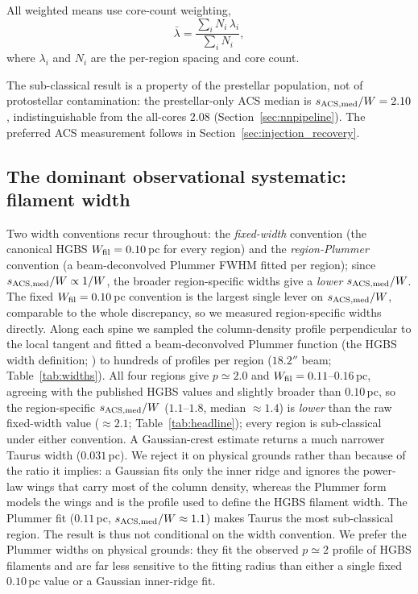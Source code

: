 \documentclass[usenatbib,twoside,twocolumn]{mnras}
\begin{document}
All weighted means use core-count weighting,
\begin{equation}
\bar{\lambda} = \frac{\sum_i N_i\,\lambda_i}{\sum_i N_i},
\label{eq:weighting}
\end{equation}
where $\lambda_i$ and $N_i$ are the per-region spacing and core count.

The sub-classical result is a property of the prestellar population, not of protostellar contamination: the prestellar-only ACS median is $s_{\rm ACS,med}/W=2.10$, indistinguishable from the all-cores $2.08$ (Section~\ref{sec:nnpipeline}). The preferred ACS measurement follows in Section~\ref{sec:injection_recovery}.

\subsection{The dominant observational systematic: filament width}
\label{sec:widths}

Two width conventions recur throughout: the \emph{fixed-width} convention (the canonical HGBS $W_{\rm fil}=0.10$\,pc for every region) and the \emph{region-Plummer} convention (a beam-deconvolved Plummer FWHM fitted per region); since $s_{\rm ACS,med}/W\propto1/W$, the broader region-specific widths give a \emph{lower} $s_{\rm ACS,med}/W$. The fixed $W_{\rm fil}=0.10$\,pc convention is the largest single lever on $s_{\rm ACS,med}/W$, comparable to the whole discrepancy, so we measured region-specific widths directly. Along each spine we sampled the column-density profile perpendicular to the local tangent and fitted a beam-deconvolved Plummer function (the HGBS width definition; \citealt{Arzoumanian2019}) to hundreds of profiles per region ($18.2''$ beam; Table~\ref{tab:widths}). All four regions give $p\simeq2.0$ and $W_{\rm fil}=0.11$--$0.16$\,pc, agreeing with the published HGBS values and slightly broader than $0.10$\,pc, so the region-specific $s_{\rm ACS,med}/W$ ($1.1$--$1.8$, median $\approx1.4$) is \emph{lower} than the raw fixed-width value ($\approx2.1$; Table~\ref{tab:headline}); every region is sub-classical under either convention. A Gaussian-crest estimate returns a much narrower Taurus width ($0.031$\,pc). We reject it on physical grounds rather than because of the ratio it implies: a Gaussian fits only the inner ridge and ignores the power-law wings that carry most of the column density, whereas the Plummer form models the wings and is the profile used to define the HGBS filament width. The Plummer fit ($0.11$\,pc, $s_{\rm ACS,med}/W\approx1.1$) makes Taurus the most sub-classical region. The result is thus not conditional on the width convention. We prefer the Plummer widths on physical grounds: they fit the observed $p\simeq2$ profile of HGBS filaments and are far less sensitive to the fitting radius than either a single fixed $0.10$\,pc value or a Gaussian inner-ridge fit.
\end{document}
